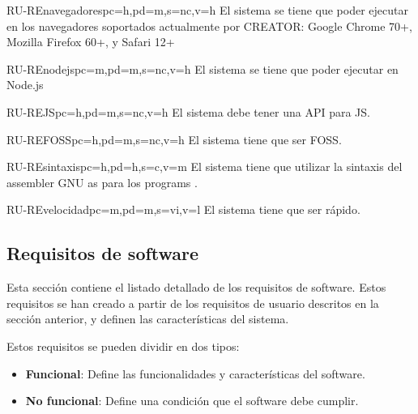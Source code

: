 \begin{userReq}{RU-RE}{navegadores}{pc=h,pd=m,s=nc,v=h}
    El sistema se tiene que poder ejecutar en los navegadores soportados
    actualmente por CREATOR: Google Chrome 70+, Mozilla Firefox 60+, y Safari
    12+
\end{userReq}

\begin{userReq}{RU-RE}{nodejs}{pc=m,pd=m,s=nc,v=h}
    El sistema se tiene que poder ejecutar en Node.js
\end{userReq}

\begin{userReq}{RU-RE}{JS}{pc=h,pd=m,s=nc,v=h}
    El sistema debe tener una \gls{API} para \gls{JS}.
\end{userReq}

\begin{userReq}{RU-RE}{FOSS}{pc=h,pd=m,s=nc,v=h}
    El sistema tiene que ser \gls{FOSS}.
\end{userReq}

\begin{userReq}{RU-RE}{sintaxis}{pc=h,pd=h,s=c,v=m}
    El sistema tiene que utilizar la sintaxis del \gls{assembler} GNU as para
    los \glspl{program} .
\end{userReq}

\begin{userReq}{RU-RE}{velocidad}{pc=m,pd=m,s=vi,v=l}
    El sistema tiene que ser rápido. %
\end{userReq}

\FloatBarrier


\subsection{Requisitos de software}\label{subsec:software-requirements}

Esta sección contiene el listado detallado de los requisitos de software. Estos
requisitos se han creado a partir de los requisitos de usuario descritos en la
sección anterior, y definen las características del sistema.

\noindent
Estos requisitos se pueden dividir en dos tipos:

\begin{itemize}
    \item \textbf{Funcional}: Define las funcionalidades y características del
    software.
    \item \textbf{No funcional}: Define una condición que el software debe cumplir.
\end{itemize}

